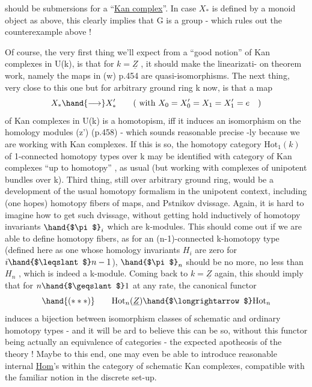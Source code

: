 
 should be submersions for a ``\uline{Kan complex}''. In case $X_*$ is
defined by a monoid object as above, this clearly implies that G is a
group  - which
rules out the counterexample above !

Of course, the very first thing we'll expect from a ``good notion'' of
Kan complexes in U(k), is that for $k=\underline{Z}$ , it should make the linearizati-%
on theorem work, namely the maps in (w) p.454 are quasi-isomorphisms.
The next thing, very close to this one but for arbitrary ground ring k
now, is that a map
\[ X_* \hand{\longrightarrow} X'_* \qquad (\text{ with } X_0=X'_0=X_1=X'_1 = e \quad ) \]
of Kan complexes in U(k) is a homotopism, iff it induces an isomorphism
on the homology modules (z') (p.458) - which sounds reasonable precise
-ly because we are working with Kan complexes. If this is so, the
homotopy category $\mathrm{Hot}_1(k)$ of  1-connected homotopy types over k
may be identified with  category of Kan complexes  ``up to
homotopy'' , as usual (but working  with complexes of unipotent bundles
over k). Third thing, still over arbitrary ground ring, would be
a development of the usual homotopy formalism in the unipotent context,
including (one hopes) homotopy fibers of maps, and Pstnikov 
dvissage. Again, it is hard to imagine how to get such dvissage,
without getting hold inductively of homotopy invariants $\hand{$\pi$}_i$ which are
k-modules. This should come out if we are able to define homotopy fibers,
as for an (n-1)-connected k-homotopy type (defined here as one whose
homology invariants $H_i$ are zero for $i\hand{$\leqslant$}n-1$), $\hand{$\pi$}_n$ should be no more, no
less than $H_n$ , which is indeed a k-module. Coming back to $k=\underline{Z}$ again,
this should imply that  for $n\hand{$\geqslant$}1$ at any rate, the canonical functor
\[ \hand{(***)} \qquad \mathrm{Hot}_n(\underline{Z}) \hand{$\longrightarrow$} \mathrm{Hot}_n \]
induces a bijection between isomorphism classes of schematic and ordinary
 homotopy types - and it will be ard to believe this can be so, without
this functor being actually an equivalence of categories - the expected
apotheosis of the theory ! Maybe to this end, one may even be able to
introduce reasonable internal \uline{Hom}'s within the category of schematic
Kan complexes,   compatible with the familiar notion
in the discrete set-up.


